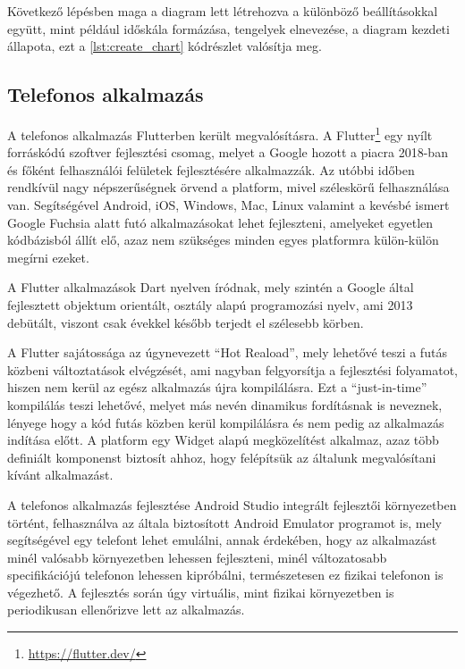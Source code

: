 Következő lépésben maga a diagram lett létrehozva a különböző beállításokkal együtt, mint például időskála formázása, tengelyek elnevezése, a diagram kezdeti állapota, ezt a \ref{lst:create_chart} kódrészlet valósítja meg.



\subsection{Telefonos alkalmazás}

A telefonos alkalmazás Flutterben került megvalósításra. A Flutter\footnote{\url{https://flutter.dev/}} egy nyílt forráskódú szoftver fejlesztési csomag, melyet a Google hozott a piacra 2018-ban és főként felhasználói felületek fejlesztésére alkalmazzák. Az utóbbi időben rendkívül nagy népszerűségnek örvend a platform, mivel széleskörű felhasználása van. Segítségével Android, iOS, Windows, Mac, Linux valamint a kevésbé ismert Google Fuchsia alatt futó alkalmazásokat lehet fejleszteni, amelyeket egyetlen kódbázisból állít elő, azaz nem szükséges minden egyes platformra külön-külön megírni ezeket.

A Flutter alkalmazások Dart nyelven íródnak, mely szintén a Google által fejlesztett objektum orientált, osztály alapú programozási nyelv, ami 2013 debütált, viszont csak évekkel később terjedt el szélesebb körben.

A Flutter sajátossága az úgynevezett “Hot Reaload”, mely lehetővé teszi a futás közbeni változtatások elvégzését, ami nagyban felgyorsítja a fejlesztési folyamatot, hiszen nem kerül az egész alkalmazás újra kompilálásra. Ezt a “just-in-time” kompilálás teszi lehetővé, melyet más nevén dinamikus fordításnak is neveznek, lényege hogy a kód futás közben kerül kompilálásra és nem pedig az alkalmazás indítása előtt. A platform egy Widget alapú megközelítést alkalmaz, azaz több definiált komponenst biztosít ahhoz, hogy felépítsük az általunk megvalósítani kívánt alkalmazást.

A telefonos alkalmazás fejlesztése Android Studio integrált fejlesztői környezetben történt, felhasználva az általa biztosított Android Emulator programot is, mely segítségével egy telefont lehet emulálni, annak érdekében, hogy az alkalmazást minél valósabb környezetben lehessen fejleszteni, minél változatosabb specifikációjú telefonon lehessen kipróbálni, természetesen ez fizikai telefonon is végezhető. A fejlesztés során úgy virtuális, mint fizikai környezetben is periodikusan ellenőrizve lett az alkalmazás.


